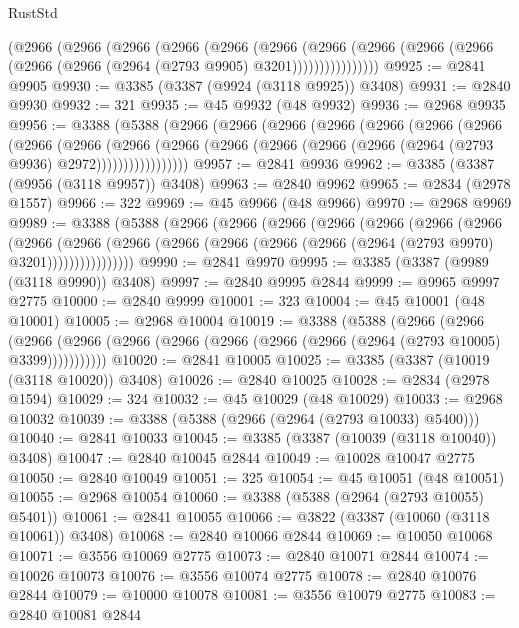 \begin{lexlean}{RustStd}
\begin{coremodule}
          (@2966
            (@2966
              (@2966
                (@2966
                  (@2966
                    (@2966
                      (@2966
                        (@2966
                          (@2966 (@2966 (@2966 (@2966 (@2964 (@2793 @9905) @3201))))))))))))))))
@9925 := @2841 @9905
@9930 := @3385 (@3387 (@9924 (@3118 @9925)) @3408)
@9931 := @2840 @9930
@9932 := 321
@9935 := @45 @9932 (@48 @9932)
@9936 := @2968 @9935
@9956 := @3388
    (@5388
      (@2966
        (@2966
          (@2966
            (@2966
              (@2966
                (@2966
                  (@2966
                    (@2966
                      (@2966
                        (@2966
                          (@2966
                            (@2966 (@2966 (@2966 (@2966 (@2964 (@2793 @9936) @2972)))))))))))))))))
@9957 := @2841 @9936
@9962 := @3385 (@3387 (@9956 (@3118 @9957)) @3408)
@9963 := @2840 @9962
@9965 := @2834 (@2978 @1557)
@9966 := 322
@9969 := @45 @9966 (@48 @9966)
@9970 := @2968 @9969
@9989 := @3388
    (@5388
      (@2966
        (@2966
          (@2966
            (@2966
              (@2966
                (@2966
                  (@2966
                    (@2966
                      (@2966
                        (@2966
                          (@2966 (@2966 (@2966 (@2966 (@2964 (@2793 @9970) @3201))))))))))))))))
@9990 := @2841 @9970
@9995 := @3385 (@3387 (@9989 (@3118 @9990)) @3408)
@9997 := @2840 @9995 @2844
@9999 := @9965 @9997 @2775
@10000 := @2840 @9999
@10001 := 323
@10004 := @45 @10001 (@48 @10001)
@10005 := @2968 @10004
@10019 := @3388
    (@5388
      (@2966
        (@2966
          (@2966 (@2966 (@2966 (@2966 (@2966 (@2966 (@2966 (@2964 (@2793 @10005) @3399)))))))))))
@10020 := @2841 @10005
@10025 := @3385 (@3387 (@10019 (@3118 @10020)) @3408)
@10026 := @2840 @10025
@10028 := @2834 (@2978 @1594)
@10029 := 324
@10032 := @45 @10029 (@48 @10029)
@10033 := @2968 @10032
@10039 := @3388 (@5388 (@2966 (@2964 (@2793 @10033) @5400)))
@10040 := @2841 @10033
@10045 := @3385 (@3387 (@10039 (@3118 @10040)) @3408)
@10047 := @2840 @10045 @2844
@10049 := @10028 @10047 @2775
@10050 := @2840 @10049
@10051 := 325
@10054 := @45 @10051 (@48 @10051)
@10055 := @2968 @10054
@10060 := @3388 (@5388 (@2964 (@2793 @10055) @5401))
@10061 := @2841 @10055
@10066 := @3822 (@3387 (@10060 (@3118 @10061)) @3408)
@10068 := @2840 @10066 @2844
@10069 := @10050 @10068
@10071 := @3556 @10069 @2775
@10073 := @2840 @10071 @2844
@10074 := @10026 @10073
@10076 := @3556 @10074 @2775
@10078 := @2840 @10076 @2844
@10079 := @10000 @10078
@10081 := @3556 @10079 @2775
@10083 := @2840 @10081 @2844

\end{coremodule}
\end{lexlean}
